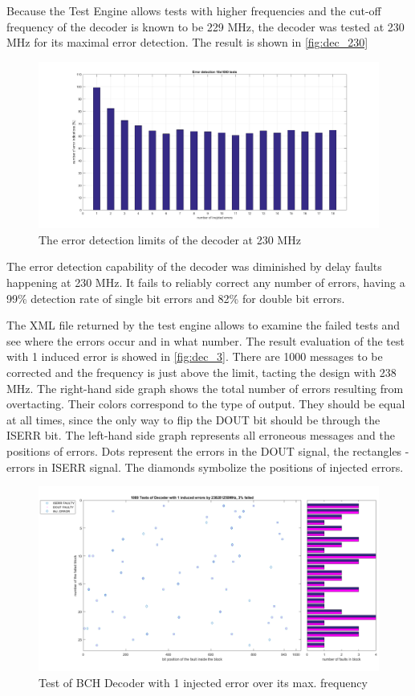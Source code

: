 Because the Test Engine allows tests with higher frequencies and the cut-off frequency of the decoder is known to be 229 MHz, the decoder was tested at 230 MHz for its maximal error detection. The result is shown in \autoref{fig:dec_230}

\begin{figure}[h]
\centering
\includegraphics[width=\textwidth]{figures/max_detection_230.png}
\caption{The error detection limits of the decoder at 230 MHz}
\label{fig:dec_1}
\end{figure}

The error detection capability of the decoder was diminished by delay faults happening at 230 MHz. It fails to reliably correct any number of errors, having a 99\% detection rate of single bit errors and 82\% for double bit errors.

The XML file returned by the test engine allows to examine the failed tests and see where the errors occur and in what number. The result evaluation of the test with 1 induced error is showed in \autoref{fig:dec_3}. There are 1000 messages to be corrected and the frequency is just above the limit, tacting the design with 238 MHz. The right-hand side graph shows the total number of errors resulting from overtacting. Their colors correspond to the type of output. They should be equal at all times, since the only way to flip the DOUT bit should be through the ISERR bit. The left-hand side graph represents all erroneous messages and the positions of errors. Dots represent the errors in the DOUT signal, the rectangles - errors in ISERR signal. The diamonds symbolize the positions of injected errors.


\begin{figure}[h]
\centering
\includegraphics[width=\textwidth]{figures/1000_tests_1_faults_238_MHz.png}
\caption{Test of BCH Decoder with 1 injected error over its max. frequency}
\label{fig:dec_3}
\end{figure}

